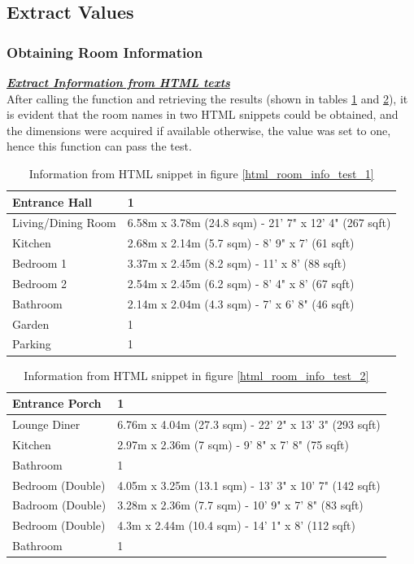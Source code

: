 \documentclass[12pt,twoside]{report}
\begin{document}
\subsection{Extract Values}

\subsubsection{Obtaining Room Information}
\textbf{\textit{\underline{Extract Information from HTML texts}}} \\
After calling the function and retrieving the results (shown in tables \ref{html_room_info_expect_1} and \ref{html_room_info_expect_2}), it is evident that the room names in two HTML snippets could be obtained, and the dimensions were acquired if available otherwise, the value was set to one, hence this function can pass the test.
\begin{table}[h]
	\centering
	\begin{tabular} {| l | l |}
		\hline
		Entrance Hall & 1\\
		\hline
		Living/Dining Room & 6.58m x 3.78m (24.8 sqm) - 21' 7" x 12' 4" (267 sqft)\\
		\hline
		Kitchen & 2.68m x 2.14m (5.7 sqm) - 8' 9" x 7' (61 sqft)\\
		\hline
		Bedroom 1 & 3.37m x 2.45m (8.2 sqm) - 11' x 8' (88 sqft)\\
		\hline
		Bedroom 2 & 2.54m x 2.45m (6.2 sqm) - 8' 4" x 8' (67 sqft)\\
		\hline 
		Bathroom & 2.14m x 2.04m (4.3 sqm) - 7' x 6' 8" (46 sqft)\\
		\hline
		Garden & 1\\
		\hline
		Parking & 1\\
		\hline
	\end{tabular}
	\caption{Information from HTML snippet in figure \ref{html_room_info_test_1}}
	\label{html_room_info_expect_1}
\end{table}

\begin{table}[h]
	\centering
	\begin{tabular} {| l | l |}
		\hline
		Entrance Porch & 1\\
		\hline
		Lounge Diner & 6.76m x 4.04m (27.3 sqm) - 22' 2" x 13' 3" (293 sqft)\\
		\hline
		Kitchen & 2.97m x 2.36m (7 sqm) - 9' 8" x 7' 8" (75 sqft)\\
		\hline
		Bathroom & 1\\
		\hline
		Bedroom (Double) & 4.05m x 3.25m (13.1 sqm) - 13' 3" x 10' 7" (142 sqft)\\
		\hline 
		Badroom (Double) & 3.28m x 2.36m (7.7 sqm) - 10' 9" x 7' 8" (83 sqft)\\
		\hline
		Bedroom (Double) & 4.3m x 2.44m (10.4 sqm) - 14' 1" x 8' (112 sqft)\\
		\hline
		Bathroom & 1\\
		\hline
	\end{tabular}
	\caption{Information from HTML snippet in figure \ref*{html_room_info_test_2}}
	\label{html_room_info_expect_2}
\end{table}
\end{document}
